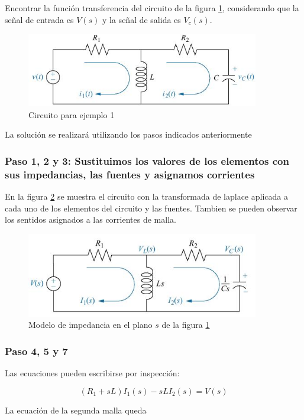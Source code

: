 \documentclass[12pt]{book}
\theoremstyle{definition}
\theoremstyle{remark}
\theoremstyle{plain}
\begin{document}
Encontrar la función transferencia del circuito de la figura \ref{fig102}, considerando que la señal de entrada es $V(s)$ y la señal de salida es $V_c(s)$.

\begin{figure}
\centering
\includegraphics[width=4in]{circuito1.jpg}
\caption{Circuito para ejemplo 1}
\label{fig102}
\end{figure}

La solución se realizará utilizando los pasos indicados anteriormente 
\subsubsection{Paso 1, 2 y 3: Sustituimos los valores de los elementos con sus impedancias, las fuentes y asignamos corrientes}
En la figura \ref{fig103} se muestra el circuito con la transformada de laplace aplicada a cada uno de los elementos del circuito y las fuentes. Tambien se pueden observar los sentidos asignados a las corrientes de malla.
\begin{figure}
\centering
\includegraphics[width=4in]{circuito1planos.jpg}
\caption{Modelo de impedancia en el plano $s$ de la figura \ref{fig102}}
\label{fig103}
\end{figure}

\subsubsection{Paso 4, 5 y 7}
Las ecuaciones pueden escribirse por inspección:

\begin{equation}
\label{equ410}
(R_1+s L) I_1 (s)- s L I_2 (s) = V(s) 
\end{equation}

La ecuación de la segunda malla queda
\end{document}
